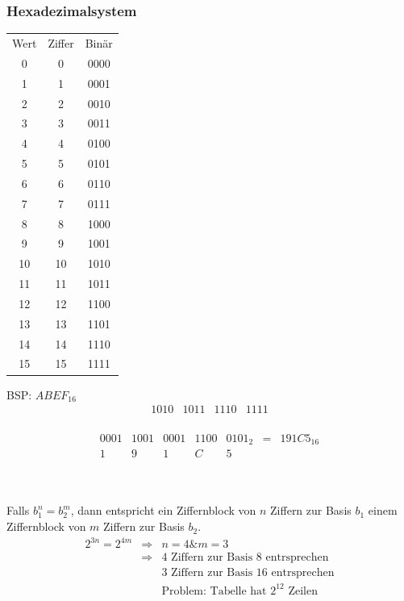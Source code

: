 \documentclass[10pt,a4paper]{scrartcl}
\begin{document}
	\subsubsection*{Hexadezimalsystem}
	\begin{tabular}{ccc}
		Wert & Ziffer & Binär\\
		0 & 0 & 0000\\
		1 & 1 & 0001\\
		2 & 2 & 0010\\
		3 & 3 & 0011\\
		4 & 4 & 0100\\
		5 & 5 & 0101\\
		6 & 6 & 0110\\
		7 & 7 & 0111\\
		8 & 8 & 1000\\
		9 & 9 & 1001\\
		10 & 10 & 1010\\
		11 & 11 & 1011\\
		12 & 12 & 1100\\
		13 & 13 & 1101\\
		14 & 14 & 1110\\
		15 & 15 & 1111\\
	\end{tabular}
\begin{minipage}[b]{0.7\textwidth}
	\centering
	BSP: $ABEF_{16}$
	$$
	\begin{array}{c|c|c|c}
	1010 & 1011 & 1110 & 1111
	\end{array}
	$$
	\\
	$$
	\begin{array}{c|c|c|c|ccc}
	0001&1001&0001&1100 & 0101_2 & = & 191C5_{16}\\
	1 & 9 & 1 & C & 5 & 
	\end{array}$$
\end{minipage}%
\\
\\
Falls $b_1^n = b_2^m$, dann entspricht ein Ziffernblock von $n$ Ziffern zur Basis $b_1$ einem Ziffernblock von $m$ Ziffern zur Basis $b_2$.
\\
$$
\begin{array}{rcl}
2^{3n} = 2^{4m} & \Rightarrow & n=4 \& m=3\\
				& \Rightarrow & \textrm{4 Ziffern zur Basis 8 entrsprechen}\\
				&             & \textrm{3 Ziffern zur Basis 16 entrsprechen}\\
				&             & \textrm{Problem: Tabelle hat } 2^{12} \textrm{ Zeilen}\\
\end{array}
$$
\end{document}
